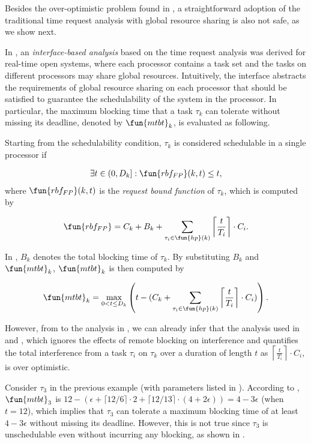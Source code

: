 Besides the over-optimistic problem found in \citep{lakshmanan-2009}, a straightforward adoption of the traditional time request analysis with global resource sharing is also not safe, as we show next.

 In \cite{NBN:11}, an \emph{interface-based analysis} based on the time request analysis was derived for real-time open systems, where each processor contains a task set and the tasks on different processors may share global resources. Intuitively, the interface abstracts the requirements of global resource sharing on each processor that should be satisfied to guarantee the schedulability of the system in the processor. In particular, the maximum blocking time that a task $\tau_k$ can tolerate without missing its deadline, denoted by $\fun{mtbt}_k$, is evaluated as following. 

Starting from the schedulability condition, $\tau_k$ is considered schedulable in a single processor if

\begin{align}\label{eq:rbf-1}
\exists t \in (0,D_k]: \fun{rbf_{FP}}(k,t) \leq t, 
\end{align}
where $\fun{rbf_{FP}}(k,t)$ is the \emph{request bound function} of $\tau_k$, which is computed by

\begin{align}\label{eq:rbf-2}
\fun{rbf_{FP}} = C_k + B_k + \sum_{\tau_i \in \fun{hp}(k)} \left \lceil \frac{t}{T_i} \right \rceil \cdot C_i.
\end{align}

In , $B_k$ denotes the total blocking time of $\tau_k$. By substituting $B_k$ and $\fun{mtbt}_k$, $\fun{mtbt}_k$ is then computed by

\begin{align}\label{eq:bloc-tolerate}
\fun{mtbt}_k = \max_{0<t \leq D_k} \left( t - ( C_k + \sum_{\tau_i \in \fun{hp}(k)} \left \lceil \frac{t}{T_i} \right \rceil \cdot C_i ) \right).
\end{align}

However, from to the analysis in , we can already infer that the analysis used in  and , which ignores the effects of remote blocking on interference and quantifies the total interference from a task $\tau_i$ on $\tau_k$ over a duration of length $t$ as $\left \lceil \frac{t}{T_i} \right \rceil \cdot C_i$, is over optimistic. 

Consider $\tau_3$ in the previous example (with parameters listed in ). According to , $\fun{mtbt}_3$ is $12 - (\epsilon + \lceil 12 / 6 \rceil \cdot 2 + \lceil 12 / 13 \rceil \cdot (4+2\epsilon)) = 4-3\epsilon$ (when $t=12$), which implies that $\tau_3$ can tolerate a maximum blocking time of at least $4-3\epsilon$ without missing its deadline. However, this is not true since $\tau_3$ is unschedulable even without incurring any blocking, as shown in .

